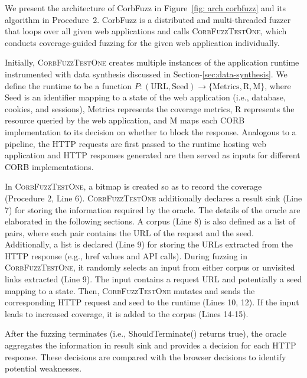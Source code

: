\documentclass[10pt,conference]{IEEEtran}
\begin{document}
We present the architecture of CorbFuzz in Figure~\ref{fig: arch corbfuzz} and its algorithm in Procedure~2. CorbFuzz is a distributed and multi-threaded fuzzer that loops over all given web applications and calls \textsc{CorbFuzzTestOne}, which conducts coverage-guided fuzzing for the given web application individually. %

Initially, \textsc{CorbFuzzTestOne} creates multiple instances of the application runtime {instrumented with data synthesis discussed in Section-\ref{sec:data-synthesis}}. We define the runtime to be a function $P: (\text{URL}, \text{Seed}) \to \{\text{Metrics}, \text{R}, \text{M}\}$, where {$\text{Seed}$ is an identifier mapping to a state of the web application (i.e., database, cookies, and sessions)}, $\text{Metrics}$ represents the coverage metrics, $\text{R}$ represents the resource queried by the web application, and $\text{M}$ maps each CORB implementation to its decision on whether to block the response. Analogous to a pipeline, the HTTP requests are first passed to the runtime hosting web application and HTTP responses generated are then served as inputs for different CORB implementations. 

In \textsc{CorbFuzzTestOne}, a bitmap is created so as to record the coverage (Procedure 2, Line 6).  \textsc{CorbFuzzTestOne} additionally declares a result sink (Line 7) for storing the information required by the oracle.
The details of the oracle are elaborated in the following sections. 
A corpus (Line 8) is also defined as a list of pairs, where each pair contains the URL of the request and the seed. 
Additionally, a list is declared (Line 9) for storing the URLs extracted from the HTTP response (e.g., href values and API calls). 
During fuzzing in \textsc{CorbFuzzTestOne}, it randomly selects an input from either corpus or unvisited links extracted (Line 9). The input contains a request URL and potentially a seed mapping to a state. Then, \textsc{CorbFuzzTestOne} mutates and sends the corresponding HTTP request and seed to the runtime (Lines 10, 12). If the input leads to increased coverage, it is added to the corpus (Lines 14-15). 

After the fuzzing terminates (i.e., ShouldTerminate() returns true), the oracle aggregates the information in result sink and provides a decision for each HTTP response. These decisions are compared with the browser decisions to identify potential weaknesses. 
\end{document}
